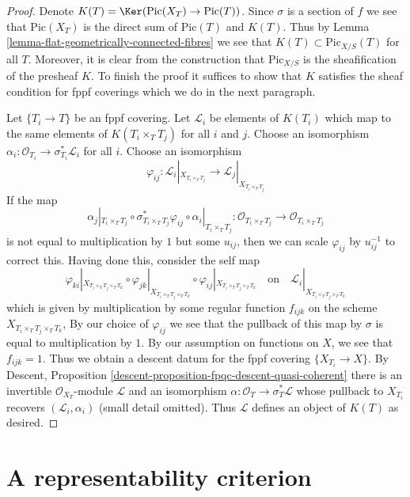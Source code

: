 \begin{proof}
Denote $K(T) = \Ker(\text{Pic}(X_T) \to \text{Pic}(T))$.
Since $\sigma$ is a section of $f$ we see that $\text{Pic}(X_T)$ is the direct
sum of $\text{Pic}(T)$ and $K(T)$.
Thus by Lemma \ref{lemma-flat-geometrically-connected-fibres} we see that
$K(T) \subset \text{Pic}_{X/S}(T)$ for all $T$. Moreover, it is clear
from the construction that $\text{Pic}_{X/S}$ is the sheafification
of the presheaf $K$. To finish the proof it suffices to show that
$K$ satisfies the sheaf condition for fppf coverings which we do
in the next paragraph.

\medskip\noindent
Let $\{T_i \to T\}$ be an fppf covering. Let $\mathcal{L}_i$ be
elements of $K(T_i)$ which map to the same elements of $K(T_i \times_T T_j)$
for all $i$ and $j$. Choose an isomorphism
$\alpha_i : \mathcal{O}_{T_i} \to \sigma_{T_i}^*\mathcal{L}_i$
for all $i$. Choose an isomorphism
$$
\varphi_{ij} :
\mathcal{L}_i|_{X_{T_i \times_T T_j}}
\longrightarrow
\mathcal{L}_j|_{X_{T_i \times_T T_j}}
$$
If the map
$$
\alpha_j|_{T_i \times_T T_j} \circ
\sigma_{T_i \times_T T_j}^*\varphi_{ij} \circ
\alpha_i|_{T_i \times_T T_j} :
\mathcal{O}_{T_i \times_T T_j} \to \mathcal{O}_{T_i \times_T T_j}
$$
is not equal to multiplication by $1$ but some $u_{ij}$, then we can scale
$\varphi_{ij}$ by $u_{ij}^{-1}$ to correct this. Having done this, consider
the self map
$$
\varphi_{ki}|_{X_{T_i \times_T T_j \times_T T_k}} \circ
\varphi_{jk}|_{X_{T_i \times_T T_j \times_T T_k}} \circ
\varphi_{ij}|_{X_{T_i \times_T T_j \times_T T_k}}
\quad\text{on}\quad
\mathcal{L}_i|_{X_{T_i \times_T T_j \times_T T_k}}
$$
which is given by multiplication by some regular function $f_{ijk}$
on the scheme $X_{T_i \times_T T_j \times_T T_k}$,
By our choice of $\varphi_{ij}$ we see that the pullback of
this map by $\sigma$ is equal to multiplication by $1$. By
our assumption on functions on $X$, we see that $f_{ijk} = 1$.
Thus we obtain a descent datum for the fppf covering
$\{X_{T_i} \to X\}$. By
Descent, Proposition \ref{descent-proposition-fpqc-descent-quasi-coherent}
there is an invertible $\mathcal{O}_{X_T}$-module $\mathcal{L}$
and an isomorphism $\alpha : \mathcal{O}_T \to \sigma_T^*\mathcal{L}$
whose pullback to $X_{T_i}$ recovers $(\mathcal{L}_i, \alpha_i)$
(small detail omitted). Thus $\mathcal{L}$ defines an object
of $K(T)$ as desired.
\end{proof}



\section{A representability criterion}
\label{section-representability}

